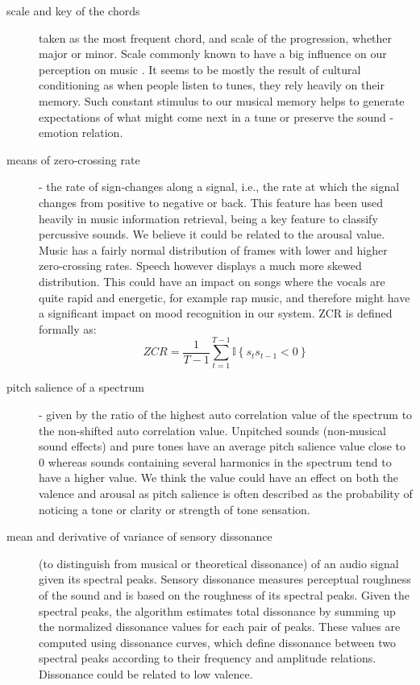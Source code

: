 \begin{description}
\item[scale and key of the chords] taken as the most frequent chord, and scale of the progression, whether major or minor. Scale commonly known to have a big influence on our perception on music \cite{keys}. It seems to be mostly the result of cultural conditioning as when people listen to tunes, they rely heavily on their memory. Such constant stimulus to our musical memory helps to generate expectations of what might come next in a tune or preserve the sound - emotion relation.

\item[means of zero-crossing rate] - the rate of sign-changes along a signal, i.e., the rate at which the signal changes from positive to negative or back. This feature has been used heavily in music information retrieval, being a key feature to classify percussive sounds. We believe it could be related to the arousal value. Music has a fairly normal distribution of frames with lower and higher zero-crossing rates. Speech however displays a much more skewed distribution. This could have an impact on songs where the vocals are quite rapid and energetic, for example rap music, and therefore might have a significant impact on mood recognition in our system.
ZCR is defined formally as: 
\begin{equation}
ZCR = \frac{1}{T-1} \sum_{t=1}^{T-1} {{\mathbb I}\left\{{s_t s_{t-1} < 0}\right\}}
\end{equation}

\item[pitch salience of a spectrum] - given by the ratio of the highest auto correlation value of the spectrum to the non-shifted auto correlation value.  Unpitched sounds (non-musical sound effects) and pure tones have an average pitch salience value close to 0 whereas sounds containing several harmonics in the spectrum tend to have a higher value. We think the value could have an effect on both the valence and arousal as pitch salience is often described as the probability of noticing a tone or clarity or strength of tone sensation.

\item[mean and derivative of variance of sensory dissonance] (to distinguish from musical or theoretical dissonance) of an audio signal given its spectral peaks. Sensory dissonance measures perceptual roughness of the sound and is based on the roughness of its spectral peaks. Given the spectral peaks, the algorithm estimates total dissonance by summing up the normalized dissonance values for each pair of peaks. These values are computed using dissonance curves, which define dissonance between two spectral peaks according to their frequency and amplitude relations. Dissonance could be related to low valence.

\end{description}

